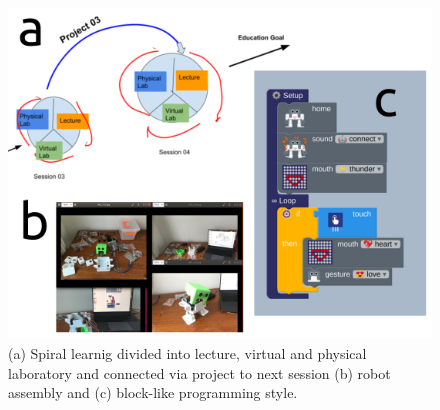 \documentclass[sigconf]{acmart}
\begin{document}
\begin{figure}[h]
  \centering
  \includegraphics[width=\linewidth]{../figures/teaching-materials/versions/drawing-v00.png}
  \caption{(a) Spiral learnig divided into lecture, virtual and physical laboratory and connected via project to next session \cite{tarik2017} (b) robot assembly and (c) block-like programming style.}
  \label{fig:tm}
\end{figure}
 


\end{document}
